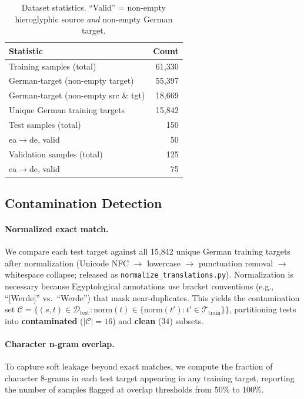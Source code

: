 \documentclass[11pt,a4paper]{article}
\begin{document}
\begin{table}[t]
\centering
\small
\begin{tabular}{lr}
\toprule
\textbf{Statistic} & \textbf{Count} \\
\midrule
Training samples (total) & 61,330 \\
\quad German-target (non-empty target) & 55,397 \\
\quad German-target (non-empty src \& tgt) & 18,669 \\
\quad Unique German training targets & 15,842 \\
\midrule
Test samples (total) & 150 \\
\quad ea$\rightarrow$de, valid & 50 \\
Validation samples (total) & 125 \\
\quad ea$\rightarrow$de, valid & 75 \\
\bottomrule
\end{tabular}
\caption{Dataset statistics. ``Valid'' = non-empty hieroglyphic source \emph{and} non-empty German target.}
\label{tab:data-stats}
\end{table}

\subsection{Contamination Detection}
\label{sec:method-contamination}

\paragraph{Normalized exact match.} We compare each test target against all 15,842 unique German training targets after normalization (Unicode NFC $\rightarrow$ lowercase $\rightarrow$ punctuation removal $\rightarrow$ whitespace collapse; released as \texttt{normalize\_translations.py}). Normalization is necessary because Egyptological annotations use bracket conventions (e.g., ``[Werde]'' vs.\ ``Werde'') that mask near-duplicates. This yields the contamination set $\mathcal{C} = \{(s,t) \in \mathcal{D}_{\text{test}} : \text{norm}(t) \in \{\text{norm}(t') : t' \in \mathcal{T}_{\text{train}}\}\}$, partitioning tests into \textbf{contaminated} ($|\mathcal{C}|=16$) and \textbf{clean} ($34$) subsets.

\paragraph{Character n-gram overlap.} To capture soft leakage beyond exact matches, we compute the fraction of character 8-grams in each test target appearing in any training target, reporting the number of samples flagged at overlap thresholds from 50\% to 100\%.
\end{document}
